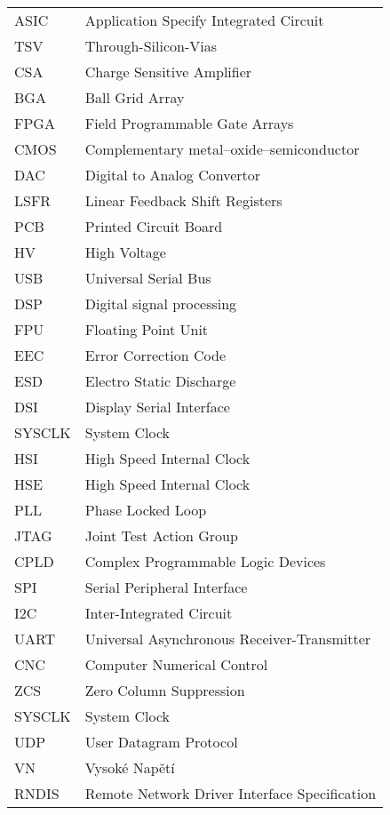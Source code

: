 \let\cleardoublepage\clearpage
{}
\begin{tabular}{ l  l }
    ASIC & Application Specify Integrated Circuit \\
	TSV	 & Through-Silicon-Vias \\
	CSA & Charge Sensitive Amplifier \\
	BGA & Ball Grid Array \\
	FPGA & Field Programmable Gate Arrays \\
	CMOS & Complementary metal–oxide–semiconductor \\
	DAC & Digital to Analog Convertor \\
	LSFR & Linear Feedback Shift Registers \\
	PCB & Printed Circuit Board \\
	HV & High Voltage \\
	USB & Universal Serial Bus \\
	DSP & Digital signal processing \\
	FPU & Floating Point Unit \\
	EEC & Error Correction Code \\
	ESD & Electro Static Discharge \\
	DSI & Display Serial Interface \\
	SYSCLK & System Clock \\
	HSI & High Speed Internal Clock \\
	HSE & High Speed Internal Clock \\
	PLL & Phase Locked Loop \\
	JTAG & Joint Test Action Group \\
	CPLD & Complex Programmable Logic Devices \\
	SPI & Serial Peripheral Interface \\
	I2C & Inter-Integrated Circuit \\
	UART & Universal Asynchronous Receiver-Transmitter \\
	CNC & Computer Numerical Control \\
	ZCS & Zero Column Suppression \\
	SYSCLK & System Clock \\
	UDP & User Datagram Protocol \\
	VN & Vysoké Napětí \\
	RNDIS & Remote Network Driver Interface Specification \\
\end{tabular}

